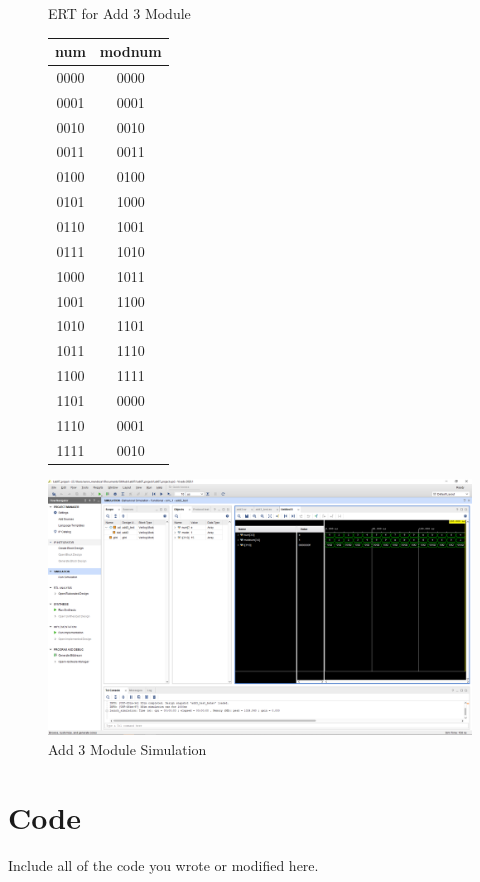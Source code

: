 \documentclass[11pt]{article}
\begin{document}
\begin{figure}[ht]\centering
		\caption{ERT for Add 3 Module}
		\label{tbl:example_table}
		\begin{tabular}{c|c}
			\toprule
			num & modnum \\
			\midrule
			0000 & 0000 \\
			0001 & 0001 \\
			0010 & 0010 \\
			0011 & 0011 \\
			0100 & 0100 \\
			0101 & 1000 \\
			0110 & 1001 \\
			0111 & 1010 \\
			1000 & 1011 \\
			1001 & 1100 \\
			1010 & 1101 \\
			1011 & 1110 \\
			1100 & 1111 \\
			1101 & 0000 \\
			1110 & 0001 \\
			1111 & 0010 \\
			\bottomrule
		\end{tabular} 

	\includegraphics[width=1\textwidth,trim=19cm 15cm 0.5cm 4.5cm,clip]{add3_test_screenshot}
	\caption{Add 3 Module Simulation}
	\label{fig:sim_with_table}
\end{figure}


\section*{Code}

Include all of the code you wrote or modified here.
\end{document}

